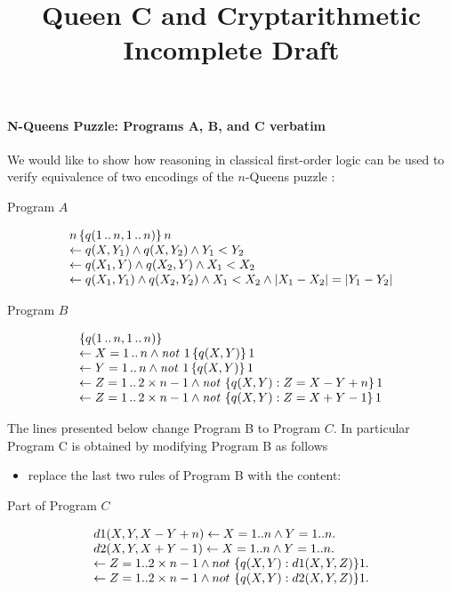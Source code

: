 \documentclass{article}
\title{Queen C and Cryptarithmetic\\ \normalsize{Incomplete Draft}}
\begin{document}
	\maketitle

\paragraph{N-Queens Puzzle: Programs A, B, and C verbatim}
  
We would like to show how reasoning in classical first-order logic can
be used to verify equivalence of two encodings of the $n$-Queens
puzzle \cite[Tables~2 and~3]{geb11b}:
\medskip

\begin{center}Program $A$\end{center}
$$
\ba l
n\,\{ q(1\,..\,n,1\,..\,n) \}\, n\\
\ar q(X,Y_1) \land q(X,Y_2) \land Y_1 < Y_2\\
\ar q(X_1,Y) \land q(X_2,Y) \land X_1 < X_2\\
\ar q(X_1,Y_1) \land q(X_2,Y_2) \land X_1 < X_2 \land |X_1-X_2| = |Y_1-Y_2|
\ea
$$


\medskip
\begin{center}Program $B$\end{center}
$$\ba l
\{ q(1\,..\,n,1\,..\,n) \}\\
\ar X = 1\,..\,n \land \no\ 1\, \{ q(X,Y) \}\, 1\\
\ar Y = 1\,..\,n \land \no\ 1\, \{ q(X,Y) \}\, 1\\
\ar Z = 1\,..\,2\times n-1 \land \no\   \{ q(X,Y) : Z = X-Y+n \}\, 1\\
\ar Z = 1\,..\,2\times n-1 \land \no\   \{ q(X,Y) : Z = X+Y-1 \}\, 1\\
\ea
$$


The lines presented below change Program B 
to Program $C$. In particular Program C is obtained by modifying Program B
as follows 
\begin{itemize}
\item replace the last two rules of Program B with the  content:
\end{itemize}
\medskip
\begin{center}Part of Program $C$\end{center}
$$\ba l
d1(X,Y,X-Y+n) \ar X = 1..n\wedge Y = 1..n.\\
d2(X,Y,X+Y-1) \ar X = 1..n\wedge Y = 1..n.\\
\ar Z = 1..2\times n-1\wedge not\ \{ q(X,Y) : d1(X,Y,Z) \} 1.\\
\ar Z = 1..2\times n-1\wedge not\ \{ q(X,Y) : d2(X,Y,Z) \} 1.
\ea
$$
\end{document}
